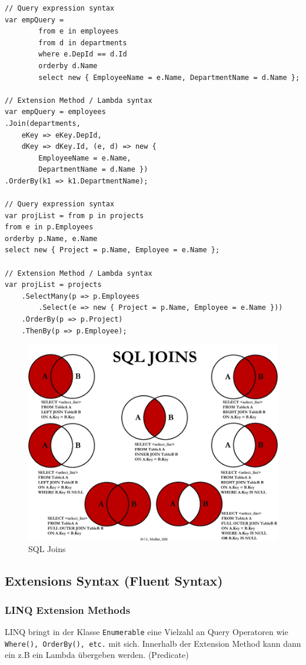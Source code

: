 \documentclass[
a4paper,
oneside,
10pt,
fleqn,
headsepline,
toc=listofnumbered, 
bibliography=totocnumbered]{scrartcl}
\begin{document}
\begin{lstlisting}
// Query expression syntax
var empQuery =
        from e in employees
        from d in departments
        where e.DepId == d.Id
        orderby d.Name
        select new { EmployeeName = e.Name, DepartmentName = d.Name };

// Extension Method / Lambda syntax
var empQuery = employees
.Join(departments, 
	eKey => eKey.DepId, 
	dKey => dKey.Id, (e, d) => new { 
		EmployeeName = e.Name, 
		DepartmentName = d.Name })
.OrderBy(k1 => k1.DepartmentName);

// Query expression syntax
var projList = from p in projects
from e in p.Employees
orderby p.Name, e.Name
select new { Project = p.Name, Employee = e.Name };

// Extension Method / Lambda syntax
var projList = projects
    .SelectMany(p => p.Employees
        .Select(e => new { Project = p.Name, Employee = e.Name }))
    .OrderBy(p => p.Project)
    .ThenBy(p => p.Employee);			  
\end{lstlisting}

\begin{figure}[h]
	\centering
	\includegraphics[width=0.6\linewidth]{images/sql_join}
	\caption{SQL Joins}
	\label{fig:entitydatamodel}
\end{figure}

\subsection{Extensions Syntax (Fluent Syntax)}
\subsubsection{LINQ Extension Methods}
LINQ bringt in der Klasse \lstinline|Enumerable| eine Vielzahl an Query Operatoren wie \lstinline|Where(), OrderBy(), etc.| mit sich. Innerhalb der Extension Method kann dann ein z.B ein Lambda übergeben werden. (Predicate)
\end{document}
